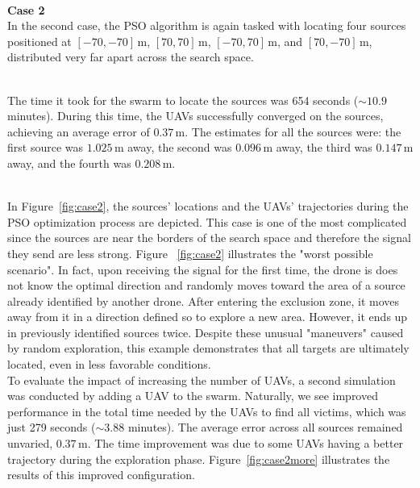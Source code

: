 \documentclass[main]{subfiles}
\begin{document}
\noindent\\
\textbf{Case 2}\\
In the second case, the PSO algorithm is again tasked with locating four 
sources positioned at \([-70, -70] \, \text{m}\), \([70, 70] \, \text{m}\), \([-70, 70] \, \text{m}\), and \([70, -70] \, \text{m}\), 
distributed very far apart across the search space.

\noindent\\
The time it took for the swarm to locate the sources was 654 seconds (\(\sim 10.9\) minutes). 
During this time, 
the UAVs successfully converged on the sources, achieving an average error of \(0.37 \, \text{m}\). 
The estimates for all the sources were: the first source was \(1.025 \, \text{m}\) away, 
the second was \(0.096 \, \text{m}\) away, the third was \(0.147 \, \text{m}\) away, 
and the fourth was \(0.208 \, \text{m}\). 

\noindent\\
In Figure~\ref{fig:case2}, the sources' locations and the UAVs' 
trajectories during the PSO optimization process are depicted. 
This case is one of the most complicated since the sources are near
the borders of the search space and therefore
the signal they send are less strong.
Figure ~\ref{fig:case2} illustrates the "worst possible scenario".
In fact, upon receiving the signal for the first time, the drone is does not know the optimal direction and 
randomly moves toward the area of a 
source already identified by another drone. 
After entering the exclusion zone, it moves away from it in a direction defined so to explore a new area. 
However, it ends up in previously identified sources twice. 
Despite these unusual "maneuvers" caused by random exploration, 
this example demonstrates that all targets are ultimately located, even in less favorable conditions.
\noindent\\
To evaluate the impact of increasing the number of UAVs, a second simulation 
was conducted by adding a UAV to the swarm. 
Naturally, we see improved performance in the total time
needed by the UAVs to find all victims, which was just 279 seconds (\(\sim 3.88\) minutes).
The average error across all sources remained unvaried, \(0.37 \, \text{m}\). 
The time improvement was due to some UAVs 
having a better trajectory during the exploration phase.
Figure~\ref{fig:case2more} illustrates the results of this improved configuration. 
\end{document}
